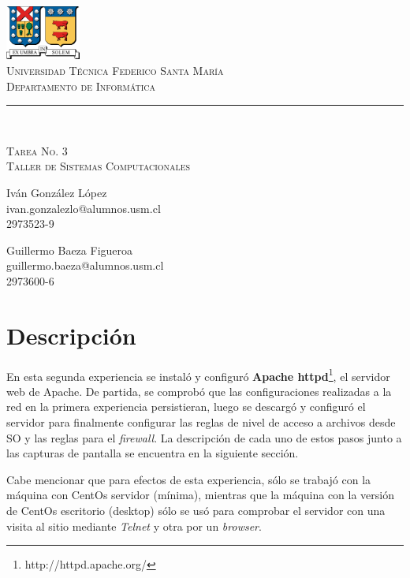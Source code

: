 \documentclass[11pt]{article}
\makeatletter
\newcommand{\labno}{3}
\newcommand{\labtitle}{Taller de Sistemas Computacionales}
\newcommand{\nameone}{Iván González López}
\newcommand{\emailone}{ivan.gonzalezlo@alumnos.usm.cl}
\newcommand{\rolone}{2973523-9}
\newcommand{\nametwo}{Guillermo Baeza Figueroa}
\newcommand{\emailtwo}{guillermo.baeza@alumnos.usm.cl}
\newcommand{\roltwo}{2973600-6}
\makeatother
\begin{document}
\begin{titlepage}
\begin{center}


\includegraphics[width=70pt]{logos/utfsm.pdf} \\
{\Large \textsc{Universidad Técnica Federico Santa María} \\}
{\Large \textsc{Departamento de Informática} \\ \vspace{4pt}}
{\rule[13pt]{\textwidth}{1pt} \\ \vspace{25pt}}
{\LARGE \textsc{Tarea No. \labno} \\}
{\LARGE \textsc{\labtitle} \\ \vspace{50pt}}

\begin{minipage}{0.4\textwidth}
\begin{flushleft}
{\large \nameone} \\
\emailone \\
\rolone
\end{flushleft}
\end{minipage}
\hfill
\begin{minipage}{0.4\textwidth}
\begin{flushright}
{\large \nametwo} \\
\emailtwo \\
\roltwo
\end{flushright}
\end{minipage}
\end{center}
\end{titlepage}

\section{Descripción}
En esta segunda experiencia se instaló y configuró \textbf{Apache httpd}\footnote{http://httpd.apache.org/}, el servidor web de Apache. De partida, se comprobó que las configuraciones realizadas a la red en la primera experiencia persistieran, luego se descargó y configuró el servidor para finalmente configurar las reglas de nivel de acceso a archivos desde SO y las reglas para el \textit{firewall}. La descripción de cada uno de estos pasos junto a las capturas de pantalla se encuentra en la siguiente sección.\par
Cabe mencionar que para efectos de esta experiencia, sólo se trabajó con la máquina con CentOs servidor (mínima), mientras que la máquina con la versión de CentOs escritorio (desktop) sólo se usó para comprobar el servidor con una visita al sitio mediante \textit{Telnet} y otra por un \textit{browser}.
\end{document}
